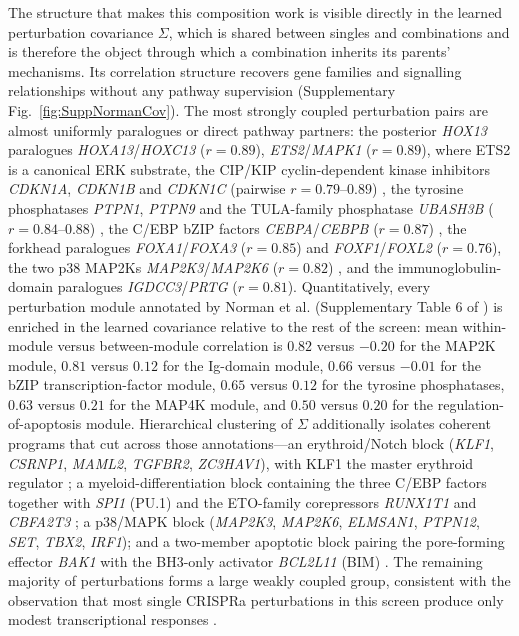 The structure that makes this composition work is visible directly in the learned perturbation
covariance $\Sigma$, which is shared between singles and combinations and is therefore the object
through which a combination inherits its parents' mechanisms. Its correlation structure recovers
gene families and signalling relationships without any pathway supervision
(Supplementary Fig.~\ref{fig:SuppNormanCov}). The most strongly coupled perturbation pairs are
almost uniformly paralogues or direct pathway partners: the posterior \textit{HOX13} paralogues
\textit{HOXA13}/\textit{HOXC13} ($r=0.89$), \textit{ETS2}/\textit{MAPK1} ($r=0.89$), where ETS2 is a
canonical ERK substrate, the CIP/KIP cyclin-dependent kinase inhibitors \textit{CDKN1A},
\textit{CDKN1B} and \textit{CDKN1C} (pairwise $r=0.79$--$0.89$) \cite{sherr1999cdk}, the tyrosine
phosphatases \textit{PTPN1}, \textit{PTPN9} and the TULA-family phosphatase \textit{UBASH3B}
($r=0.84$--$0.88$) \cite{tsygankov2013tula}, the C/EBP bZIP factors \textit{CEBPA}/\textit{CEBPB}
($r=0.87$) \cite{friedman2007cebp}, the forkhead paralogues \textit{FOXA1}/\textit{FOXA3} ($r=0.85$)
and \textit{FOXF1}/\textit{FOXL2} ($r=0.76$), the two p38 MAP2Ks \textit{MAP2K3}/\textit{MAP2K6}
($r=0.82$) \cite{cuenda2007p38}, and the immunoglobulin-domain paralogues
\textit{IGDCC3}/\textit{PRTG} ($r=0.81$). Quantitatively, every perturbation module annotated by
Norman et al. (Supplementary Table 6 of \cite{norman2019exploring}) is enriched in the learned
covariance relative to the rest of the screen: mean within-module versus between-module correlation
is $0.82$ versus $-0.20$ for the MAP2K module, $0.81$ versus $0.12$ for the Ig-domain module, $0.66$
versus $-0.01$ for the bZIP transcription-factor module, $0.65$ versus $0.12$ for the tyrosine
phosphatases, $0.63$ versus $0.21$ for the MAP4K module, and $0.50$ versus $0.20$ for the
regulation-of-apoptosis module. Hierarchical clustering of $\Sigma$ additionally isolates coherent
programs that cut across those annotations---an erythroid/Notch block
(\textit{KLF1}, \textit{CSRNP1}, \textit{MAML2}, \textit{TGFBR2}, \textit{ZC3HAV1}), with KLF1 the
master erythroid regulator \cite{siatecka2011klf1}; a myeloid-differentiation block containing the
three C/EBP factors together with \textit{SPI1} (PU.1) and the ETO-family corepressors
\textit{RUNX1T1} and \textit{CBFA2T3} \cite{rosenbauer2007transcription,davis2003eto}; a p38/MAPK
block (\textit{MAP2K3}, \textit{MAP2K6}, \textit{ELMSAN1}, \textit{PTPN12}, \textit{SET},
\textit{TBX2}, \textit{IRF1}); and a two-member apoptotic block pairing the pore-forming effector
\textit{BAK1} with the BH3-only activator \textit{BCL2L11} (BIM) \cite{youle2008bcl2}. The remaining
majority of perturbations forms a large weakly coupled group, consistent with the observation that
most single CRISPRa perturbations in this screen produce only modest transcriptional responses
\cite{norman2019exploring}.

